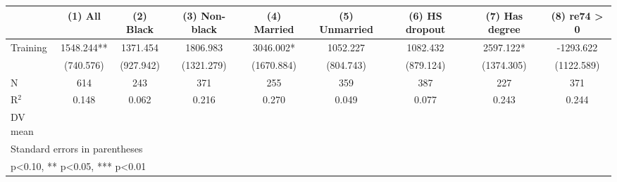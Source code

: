 \begin{table}[htbp]
\centering
\begin{tabular}{lcccccccc}
\hline\hline
 & (1) All & (2) Black & (3) Non-black & (4) Married & (5) Unmarried & (6) HS dropout & (7) Has degree & (8) re74 > 0 \\
\hline
Training & 1548.244** & 1371.454 & 1806.983 & 3046.002* & 1052.227 & 1082.432 & 2597.122* & -1293.622 \\
 & (740.576) & (927.942) & (1321.279) & (1670.884) & (804.743) & (879.124) & (1374.305) & (1122.589) \\
\hline
N & 614 & 243 & 371 & 255 & 359 & 387 & 227 & 371 \\
R$^2$ & 0.148 & 0.062 & 0.216 & 0.270 & 0.049 & 0.077 & 0.243 & 0.244 \\
DV mean &  &  &  &  &  &  &  &  \\
\hline\hline
\multicolumn{9}{l}{\footnotesize Standard errors in parentheses} \\
\multicolumn{9}{l}{\footnotesize * p<0.10, ** p<0.05, *** p<0.01} \\
\end{tabular}
\end{table}